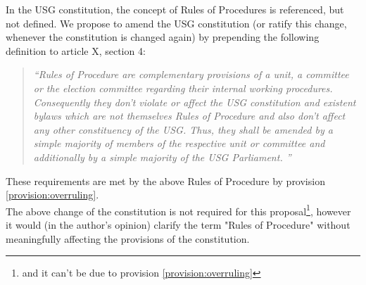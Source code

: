 In the USG constitution, the concept of Rules of Procedures is referenced, but not defined. 
We propose to amend the USG constitution (or ratify this change, whenever the constitution is changed again) by prepending the following definition to article X, section 4:

\begin{quote}\emph{
	``Rules of Procedure are complementary provisions of a unit, a committee or the election committee regarding their internal working procedures. Consequently they don't violate or affect the USG constitution and existent bylaws which are not themselves Rules of Procedure and also don't affect any other constituency of the USG. 
	Thus, they shall be amended by a simple majority of members of the respective unit or committee and additionally by a simple majority of the USG Parliament.
	''} %
\end{quote}
These requirements are met by the above Rules of Procedure by provision \ref{provision:overruling}.\\

The above change of the constitution is not required for this proposal\protect\footnote{and it can't be due to provision \ref{provision:overruling}}, however it would (in the author's opinion) clarify the term "Rules of Procedure" without meaningfully affecting the provisions of the constitution. 